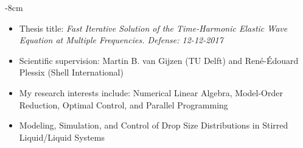 \documentclass[10pt,a4paper]{altacv}
\begin{document}

\begin{adjustwidth}{}{-8cm}
\makecvheader
\end{adjustwidth}


\begin{itemize}
\item Thesis title: \textit{Fast Iterative Solution of the Time-Harmonic Elastic Wave Equation at Multiple Frequencies. \hfill \small{Defense: 12-12-2017}}
\item Scientific supervision: Martin B. van Gijzen (TU Delft) and Ren\'e-\'Edouard  Plessix (Shell International)
\item My research interests include: Numerical Linear Algebra, Model-Order Reduction, Optimal Control, and Parallel Programming
\end{itemize}

\divider

\begin{itemize}
\item Modeling, Simulation, and Control of Drop Size Distributions in Stirred Liquid/Liquid Systems
\end{itemize}
\end{document}
